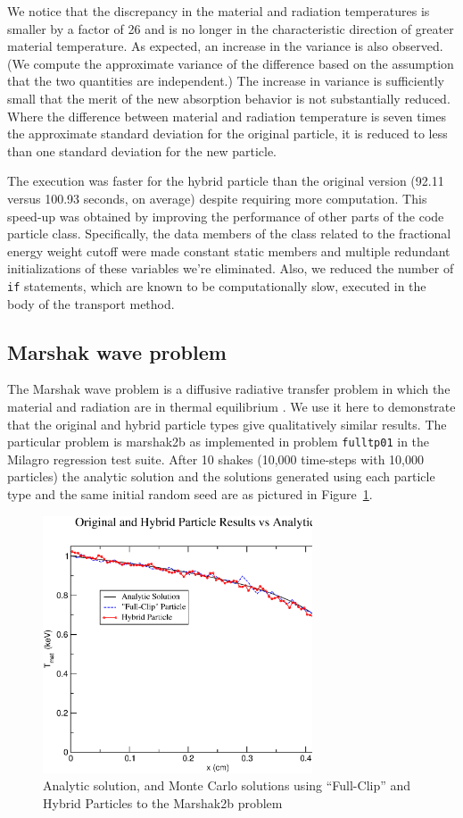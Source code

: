\documentclass[11pt]{nmemo}
\begin{document}
We notice that the discrepancy in the material and radiation
temperatures is smaller by a factor of 26 and is no longer in the
characteristic direction of greater material temperature. As expected,
an increase in the variance is also observed. (We compute the
approximate variance of the difference based on the assumption that
the two quantities are independent.) The increase in variance is
sufficiently small that the merit of the new absorption behavior is
not substantially reduced. Where the difference between material and
radiation temperature is seven times the approximate standard
deviation for the original particle, it is reduced to less than one
standard deviation for the new particle.

The execution was faster for the hybrid particle than the original
version (92.11 versus 100.93 seconds, on average) despite requiring
more computation. This speed-up was obtained by improving the
performance of other parts of the code particle class. Specifically,
the data members of the class related to the fractional energy weight
cutoff were made constant static members and multiple redundant
initializations of these variables we're eliminated. Also, we reduced
the number of \texttt{if} statements, which are known to be
computationally slow, executed in the body of the transport method.

\subsection{Marshak wave problem}

The Marshak wave problem is a diffusive radiative transfer problem in
which the material and radiation are in thermal equilibrium
\cite{lams:2421}. We use it here to demonstrate that the original and
hybrid particle types give qualitatively similar results. The
particular problem is marshak2b as implemented in problem
\texttt{fulltp01} in the Milagro regression test suite. After 10
shakes (10,000 time-steps with 10,000 particles) the analytic solution
and the solutions generated using each particle type and the same
initial random seed are as pictured in Figure~\ref{fig:marshak2b}.

\vspace{1em}
\begin{figure}[h]
  \centerline{\includegraphics[height=3.0in]{plot}}
  \caption{Analytic solution, and Monte Carlo solutions using ``Full-Clip''
    and Hybrid Particles to the Marshak2b problem}
  \label{fig:marshak2b}
\end{figure}
\end{document}
